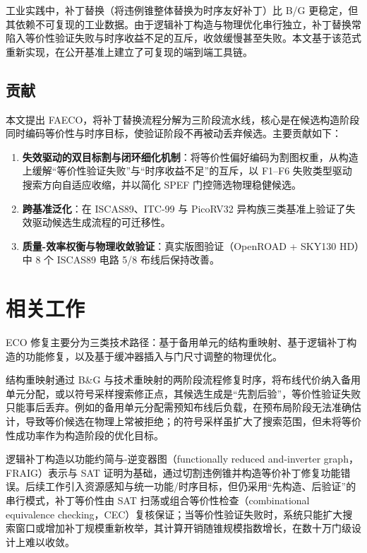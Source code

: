 \documentclass[journal]{IEEEtran}
\begin{document}
工业实践中，补丁替换（将违例锥整体替换为时序友好补丁）比 B/G 更稳定，但其依赖不可复现的工业数据。由于逻辑补丁构造与物理优化串行独立，补丁替换常陷入等价性验证失败与时序收益不足的互斥，收敛缓慢甚至失败。本文基于该范式重新实现，在公开基准上建立了可复现的端到端工具链。

\subsection{贡献}

本文提出 FAECO，将补丁替换流程分解为三阶段流水线，核心是在候选构造阶段同时编码等价性与时序目标，使验证阶段不再被动丢弃候选。主要贡献如下：

\begin{enumerate}
  \item \textbf{失效驱动的双目标割与闭环细化机制}：将等价性偏好编码为割图权重，从构造上缓解“等价性验证失败”与“时序收益不足”的互斥，以 F1--F6 失败类型驱动搜索方向自适应收缩，并以简化 SPEF 门控筛选物理稳健候选。
  \item \textbf{跨基准泛化}：在 ISCAS89、ITC-99 与 PicoRV32 异构族三类基准上验证了失效驱动候选生成流程的可迁移性。
  \item \textbf{质量-效率权衡与物理收敛验证}：真实版图验证（OpenROAD + SKY130 HD）中 8 个 ISCAS89 电路 5/8 布线后保持改善。
\end{enumerate}

\section{相关工作}

ECO 修复主要分为三类技术路径：基于备用单元的结构重映射、基于逻辑补丁构造的功能修复，以及基于缓冲器插入与门尺寸调整的物理优化。

结构重映射通过 B\&G 与技术重映射的两阶段流程修复时序，将布线代价纳入备用单元分配\cite{ho2010eco,ho2012treco}，或以符号采样搜索修正点\cite{kravets2019symbolic}，其候选生成是“先割后验”，等价性验证失败只能事后丢弃。例如\cite{ho2010eco}的备用单元分配需预知布线后负载，在预布局阶段无法准确估计，导致等价候选在物理上常被拒绝；\cite{kravets2019symbolic}的符号采样虽扩大了搜索范围，但未将等价性成功率作为构造阶段的优化目标。

逻辑补丁构造以功能约简与-逆变器图（functionally reduced and-inverter graph，FRAIG）表示与 SAT 证明为基础，通过切割违例锥并构造等价补丁修复功能错误\cite{jiang2010fraig,jiang2016resource}。后续工作引入资源感知\cite{jiang2016resource}与统一功能/时序目标\cite{lin2011simult,luo2016unified}，但仍采用“先构造、后验证”的串行模式，补丁等价性由 SAT 扫荡或组合等价性检查（combinational equivalence checking，CEC）复核保证\cite{mishchenko2006sat,zhong2024stp}；当等价性验证失败时，系统只能扩大搜索窗口或增加补丁规模重新枚举\cite{zhuo2018patch}，其计算开销随锥规模指数增长，在数十万门级设计上难以收敛。
\end{document}
